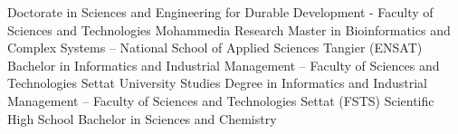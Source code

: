 %
%
%


\begin{scholarship}
					{Doctorate in Sciences and Engineering for Durable Development - Faculty of Sciences and Technologies Mohammedia}
					{Research Master in Bioinformatics and Complex Systems – National School of Applied Sciences Tangier (ENSAT)}
					{Bachelor in Informatics and Industrial Management – Faculty of Sciences and Technologies Settat}
					{University Studies Degree in Informatics and Industrial Management – Faculty of Sciences and Technologies Settat (FSTS)}
					{Scientific High School Bachelor in Sciences and Chemistry}
\end{scholarship}
